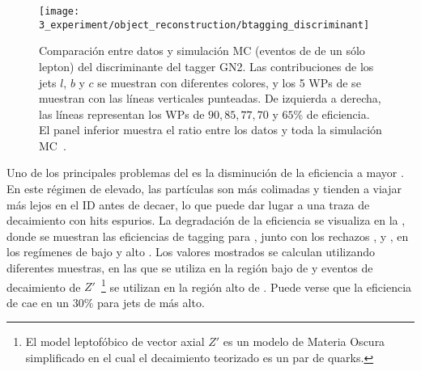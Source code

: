 \begin{figure}[ht!]
    \centering
    \texttt{[image: 3\_experiment/object\_reconstruction/btagging\_discriminant]}
    \caption{Comparaci\'on entre datos y simulaci\'on \ac{MC} (eventos de \ttbar de un s\'olo lepton) del discriminante del tagger GN2. Las contribuciones de los jets \(l\), \(b\) y \(c\) se muestran con diferentes colores, y los 5 \acp{WP} de \btagging se muestran con las l\'ineas verticales punteadas. De izquierda a derecha, las l\'ineas representan los \acp{WP} de \(90, 85, 77, 70\) y \(65\%\) de eficiencia. El panel inferior muestra el ratio entre los datos y toda la simulaci\'on \ac{MC}~\cite{ATLAS-FTAG-GN2BtagWPs}.}
    \label{fig:objects:jet_tagging:btag_discrminant}
\end{figure}

Uno de los principales problemas del \btagging es la disminución de la eficiencia a mayor \pt. En este régimen de \pt elevado, las partículas son m\'as colimadas y tienden a viajar más lejos en el \ac{ID} antes de decaer, lo que puede dar lugar a una traza de decaimiento con hits espurios. La degradación de la eficiencia se visualiza en la \Tab{\ref{tab:objects:ftag:btag_efficiency_original}}, donde se muestran las eficiencias de tagging para \bjets, junto con los rechazos \cjets, \ljets y \tjets, en los regímenes de bajo y alto \pt. Los valores mostrados se calculan utilizando diferentes muestras, en las que \ttbar se utiliza en la región bajo de \pt y eventos de decaimiento de \(Z'\)~\footnote{El model leptof\'obico de vector axial \(Z'\) es un modelo de Materia Oscura simplificado en el cual el decaimiento teorizado es un par de quarks.} se utilizan en la región alto de \pt. Puede verse que la eficiencia de \btag cae en un \(30\%\) para jets de \pt más alto.

\begin{table}[ht!]
    \caption{Medidas de eficiencias de \btagging, y de rechazos de \cjets, \ljets y \tjets, en los regímenes de bajo y alto \pt.}
    \label{tab:objects:ftag:btag_efficiency_original}
\end{table}


